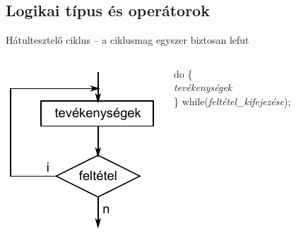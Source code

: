 \documentclass[usenames,dvipsnames,aspectratio=169]{beamer}
\begin{document}
\subsection{Logikai típus és operátorok}
\begin{frame}
  \begin{exampleblock}{}
    \vspace{-.2cm}
    
    \vspace{-.2cm}
  \end{exampleblock}
\end{frame}

\begin{frame}
  Hátultesztelő ciklus -- a ciklusmag egyszer biztosan lefut
  \begin{columns}[c]
      \begin{center}
        \includegraphics{hatul.pdf}
      \end{center}
      do \{ \\
      \hspace{0.5cm} \emph{tevékenységek} \\
      \} while(\emph{feltétel\_kifejezése});
  \end{columns}
\end{frame}
\end{document}
